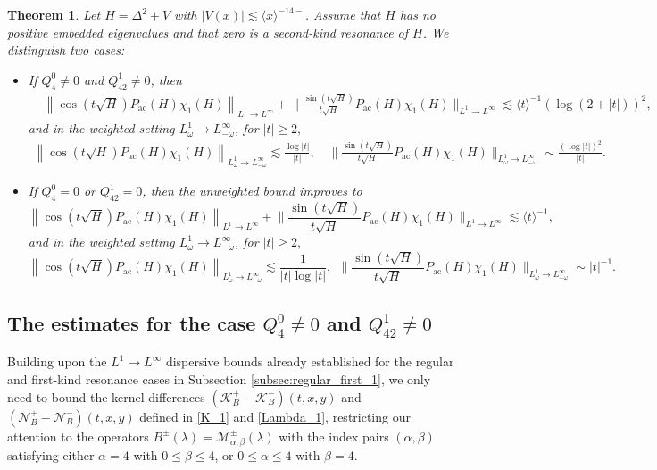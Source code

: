 \documentclass[reqno]{amsart}
\newtheorem{theorem}{Theorem}[section]
\numberwithin{equation}{section}
\begin{document}
\begin{theorem}\label{main_theorem_low_2}
Let $H = \Delta^2 + V$ with $|V(x)| \lesssim \langle x \rangle^{-14-}$.
Assume that $H$ has no positive embedded eigenvalues and that zero is a second-kind resonance of $H$. We distinguish two cases:
\begin{itemize}
    \item If $Q_4^0 \neq 0$ and $Q_{42}^1 \neq 0$, then
$$
\begin{aligned}
& \left\|\cos (t \sqrt{H}) P_{\mathrm{ac}}(H)\chi_1(H)\right\|_{L^1 \rightarrow L^{\infty}}
+ \bigg \|\frac{\sin (t \sqrt{H})}{t\sqrt{H}} P_{\mathrm{ac}}(H)\chi_1(H)\bigg \|_{L^1 \to L^{\infty}}
\lesssim \langle t \rangle^{-1}(\log (2+|t|))^2,
\end{aligned}
$$
and in the weighted setting $L^1_\omega\to L^\infty_{-\omega}$, for $|t| \ge 2,$
     \begin{align*}
		\left\|
			\cos(t\sqrt H)P_{\mathrm{ac}}(H)\chi_1(H)
			\right\|_{L^1_\omega\to L^\infty_{-\omega}}\lesssim \frac{\log|t|}{|t|},\quad \bigg\|
		\frac{\sin(t\sqrt H)}{t\sqrt H}
			P_{\mathrm{ac}}(H)\chi_1(H)
			\bigg\|_{L^1_\omega\to L^\infty_{-\omega}}
			\sim
			\frac{(\log|t|)^2}{|t|}. 
		\end{align*}

    \item If $Q_4^0 = 0$ or $Q_{42}^1 = 0$,  then  the unweighted  bound improves to
\begin{equation}\label{2-t}
    \left\|\cos (t \sqrt{H}) P_{\mathrm{ac}}(H)\chi_1(H)\right\|_{L^1 \to L^{\infty}} +
    \bigg\|\frac{\sin (t \sqrt{H})}{t\sqrt{H}} P_{\mathrm{ac}}(H) \chi_1(H) \bigg\|_{L^1 \to L^{\infty}} \lesssim \langle t \rangle^{-1},
\end{equation}
and in the weighted setting $L^1_\omega\to L^\infty_{-\omega}$, for $|t| \ge 2,$
\[
\left \|\cos (t \sqrt{H}) P_{\mathrm{ac}}(H)\chi_1(H)\right\|_{L^1_\omega\to L^\infty_{-\omega}} \lesssim\frac{1}{|t|\log |t|},  \ \ \bigg\|\frac{\sin (t \sqrt{H})}{t\sqrt{H}} P_{\mathrm{ac}}(H)\chi_1(H)\bigg\|_{L^1_\omega\to L^\infty_{-\omega}}\sim|t|^{-1}.
\]
      \end{itemize}
      \end{theorem}

\subsection{The estimates for the case $Q_{4}^0 \neq 0$ and $Q_{42}^1 \neq 0$} \label{subsec:second_1}  
Building upon the $L^1\to L^\infty$ dispersive bounds already established for the regular and first-kind resonance cases in Subsection \ref{subsec:regular_first_1}, we only need to bound the kernel differences $(\mathcal{K}_{B}^+-\mathcal{K}_{B}^-)(t,x,y)$ and $(\mathcal{N}_{B}^+-\mathcal{N}_{B}^-)(t,x,y)$ defined in \eqref{K_1} and \eqref{Lambda_1}, restricting our attention to the operators $B^\pm(\lambda)=\mathcal{M}_{\alpha, \beta}^{\pm}(\lambda)$ with the index pairs $(\alpha, \beta)$ satisfying either $\alpha=4$ with $0 \le \beta \le 4$, or $0 \le \alpha \le 4$ with $\beta=4$.  
\end{document}
